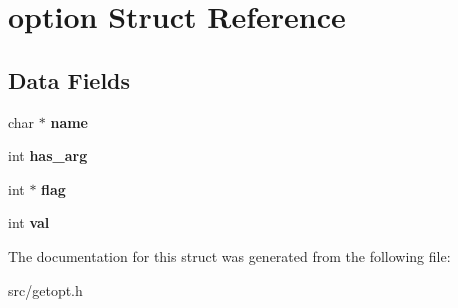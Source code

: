\hypertarget{structoption}{}\section{option Struct Reference}
\label{structoption}
\subsection*{Data Fields}
\begin{DoxyCompactItemize}
\item 
\hypertarget{structoption_a92c850a23c7828c1dba453bf8d15e1f0}{}char $\ast$ {\bfseries name}\label{structoption_a92c850a23c7828c1dba453bf8d15e1f0}

\item 
\hypertarget{structoption_a90d7ee9a51eea5c002682dbd0af149e4}{}int {\bfseries has\+\_\+arg}\label{structoption_a90d7ee9a51eea5c002682dbd0af149e4}

\item 
\hypertarget{structoption_ab366eea5fe7be25c1928328ba715e353}{}int $\ast$ {\bfseries flag}\label{structoption_ab366eea5fe7be25c1928328ba715e353}

\item 
\hypertarget{structoption_a13bd155ec3b405d29c41ab8d0793be11}{}int {\bfseries val}\label{structoption_a13bd155ec3b405d29c41ab8d0793be11}

\end{DoxyCompactItemize}


The documentation for this struct was generated from the following file\+:\begin{DoxyCompactItemize}
\item 
src/getopt.\+h\end{DoxyCompactItemize}
